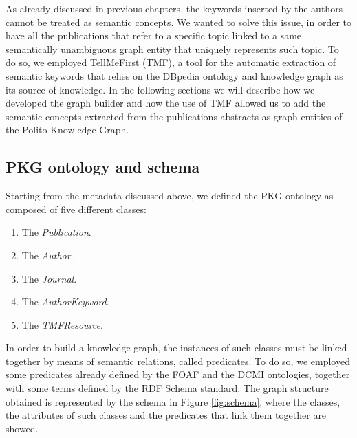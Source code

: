\documentclass[%
    corpo=13.5pt,
    twoside,
    oldstyle,
    tipotesi=magistrale,
    greek,
    evenboxes
]{toptesi}
\begin{document}
As already discussed in previous chapters, the keywords inserted by the authors
cannot be treated as semantic concepts. We wanted to solve this issue, in order
to have all the publications that refer to a specific topic linked to a
same semantically unambiguous graph entity that uniquely represents such topic.
To do so, we employed TellMeFirst (TMF), a tool for the automatic extraction of
semantic keywords that relies on the DBpedia ontology and knowledge graph as
its source of knowledge.
In the following sections we will describe how we developed the graph builder
and how the use of TMF allowed us to add the semantic concepts extracted from
the publications abstracts as graph entities of the Polito Knowledge Graph.


\subsection{PKG ontology and schema}

Starting from the metadata discussed above, we defined
the PKG ontology as composed of five different classes:

\begin{enumerate}
    \item The \emph{Publication}.
    \item The \emph{Author}.
    \item The \emph{Journal}.
    \item The \emph{AuthorKeyword}.
    \item The \emph{TMFResource}.
\end{enumerate}

In order to build a knowledge graph, the instances of such classes must be
linked together by means of semantic relations, called predicates.
To do so, we employed some predicates already defined by the
FOAF\cite{brickley2007} and the DCMI\cite{weibel1998} ontologies, together with
some terms defined by the RDF Schema standard.
The graph structure obtained is represented by the schema in
Figure \ref{fig:schema}, where the classes, the attributes of such classes and
the predicates that link them together are showed.
\end{document}
